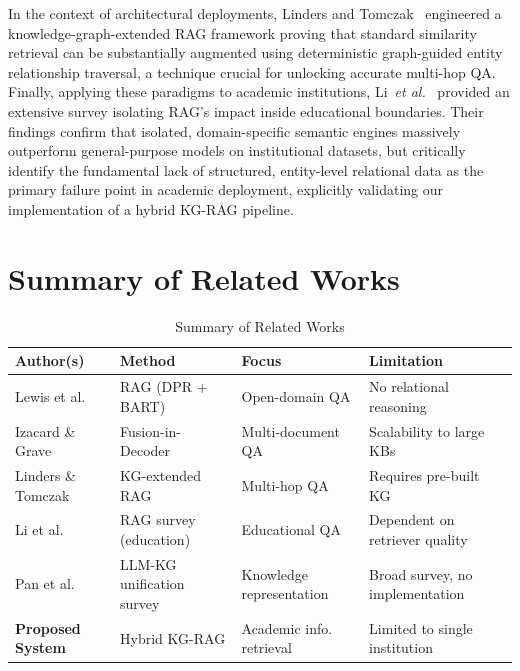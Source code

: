 \documentclass[12pt,a4paper]{report}
\begin{document}
\par
In the context of architectural deployments, Linders and Tomczak~\cite{kg_rag_springer} engineered a knowledge-graph-extended RAG framework proving that standard similarity retrieval can be substantially augmented using deterministic graph-guided entity relationship traversal, a technique crucial for unlocking accurate multi-hop QA. Finally, applying these paradigms to academic institutions, Li~\textit{et al.}~\cite{rag_edu_elsevier} provided an extensive survey isolating RAG's impact inside educational boundaries. Their findings confirm that isolated, domain-specific semantic engines massively outperform general-purpose models on institutional datasets, but critically identify the fundamental lack of structured, entity-level relational data as the primary failure point in academic deployment, explicitly validating our implementation of a hybrid KG-RAG pipeline.
\clearpage

\section{Summary of Related Works}

\begin{table}[htbp]
  \centering
    \vspace*{5pt}
  \begin{tabular}{|p{3cm}|p{3.2cm}|p{3cm}|p{3cm}|}
    \hline
    \textbf{Author(s)} & \textbf{Method} & \textbf{Focus} & \textbf{Limitation} \\ \hline
    Lewis et al.~\cite{lewis2020}       & RAG (DPR + BART)           & Open-domain QA          & No relational reasoning           \\ \hline
    Izacard \& Grave~\cite{izacard2021} & Fusion-in-Decoder          & Multi-document QA        & Scalability to large KBs          \\ \hline
    Linders \& Tomczak~\cite{kg_rag_springer} & KG-extended RAG      & Multi-hop QA             & Requires pre-built KG              \\ \hline
    Li et al.~\cite{rag_edu_elsevier}   & RAG survey (education)     & Educational QA           & Dependent on retriever quality    \\ \hline
    Pan et al.~\cite{pan2024}           & LLM-KG unification survey  & Knowledge representation & Broad survey, no implementation   \\ \hline
    \textbf{Proposed System}            & Hybrid KG-RAG              & Academic info. retrieval & Limited to single institution     \\ \hline
  \end{tabular}
  \caption{Summary of Related Works}
  \label{tab:litreview}

\end{table}
\end{document}
